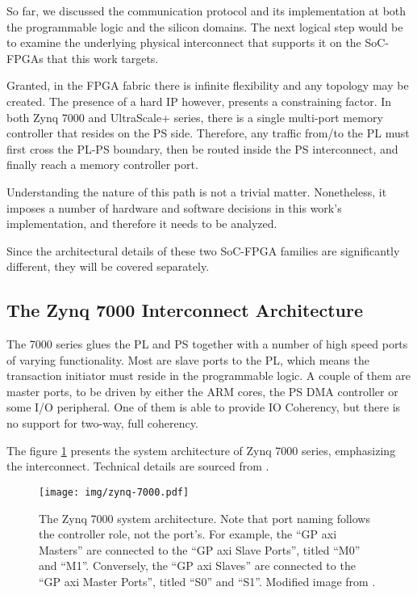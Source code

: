So far, we discussed the communication protocol and its implementation at both
the programmable logic and the silicon domains.
The next logical step would be to examine the underlying physical interconnect
that supports it on the SoC-FPGAs that this work targets.

Granted, in the FPGA \gls{fabric} there is infinite flexibility and any topology may be created.
The presence of a hard IP however, presents a constraining factor.
In both Zynq 7000 and UltraScale+ series,
there is a single multi-port memory controller
that resides on the PS side. Therefore, any traffic from/to the PL must
first cross the PL-PS boundary, then be routed inside the PS interconnect,
and finally reach a memory controller port.

Understanding the nature of this path is not a trivial matter.
Nonetheless, it imposes a number of hardware and software decisions
in this work's implementation, and therefore it needs to be analyzed.

Since the architectural details of these two SoC-FPGA families are
significantly different, they will be covered separately.

\subsection{The Zynq 7000 Interconnect Architecture}

The 7000 series glues the PL and PS together with a number of
high speed ports of varying functionality. Most are slave ports to the
PL, which means the transaction initiator must reside in the programmable logic.
A couple of them are master ports, to be driven by either the ARM cores,
the PS DMA controller or some I/O peripheral.
One of them is able to provide \gls{IO Coherency},
but there is no support for two-way, full coherency.

The figure \ref{fig:zynq7000-interconnect} presents the system architecture
of Zynq 7000 series, emphasizing the interconnect.
Technical details are sourced from \cite{ug585}.

\begin{figure}[htbp]
  \centering
  \texttt{[image: img/zynq-7000.pdf]}
  \caption{The Zynq 7000 system architecture.
  Note that port naming follows the controller role, not the port's.
  For example, the ``GP \gls{axi} Masters'' are connected to the
  ``GP \gls{axi} Slave Ports'', titled ``M0'' and ``M1''. Conversely,
  the ``GP \gls{axi} Slaves'' are connected to the ``GP \gls{axi} Master Ports'', titled ``S0'' and ``S1''.
  Modified image from \cite{ug585}.
  }
  \label{fig:zynq7000-interconnect}
\end{figure}

